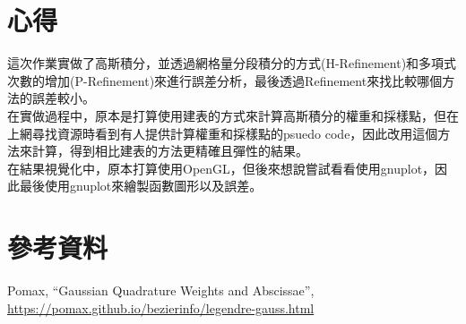 \documentclass[a4paper,12pt]{article}
\begin{document}
\section{心得}
這次作業實做了高斯積分，並透過網格量分段積分的方式(H-Refinement)和多項式次數的增加(P-Refinement)來進行誤差分析，最後透過Refinement來找比較哪個方法的誤差較小。\\
在實做過程中，原本是打算使用建表的方式來計算高斯積分的權重和採樣點，但在上網尋找資源時看到有人提供計算權重和採樣點的psuedo code，因此改用這個方法來計算，得到相比建表的方法更精確且彈性的結果。\\
在結果視覺化中，原本打算使用OpenGL，但後來想說嘗試看看使用gnuplot，因此最後使用gnuplot來繪製函數圖形以及誤差。

\section{參考資料}

\begin{thebibliography}{1}

Pomax, “Gaussian Quadrature Weights and Abscissae”, \url{https://pomax.github.io/bezierinfo/legendre-gauss.html}

\end{thebibliography}
\end{document}
